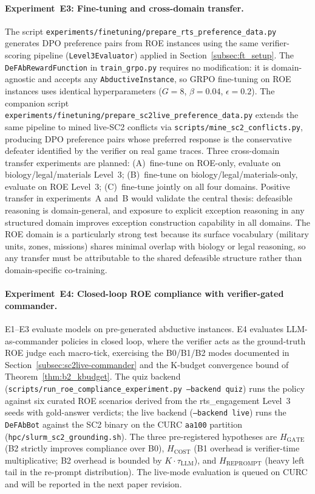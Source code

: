 \documentclass{article}
\theoremstyle{definition}
\begin{document}
\paragraph{Experiment~E3: Fine-tuning and cross-domain transfer.} The script \texttt{experiments/finetuning/prepare\_rts\_preference\_data.py} generates DPO preference pairs from ROE instances using the same verifier-scoring pipeline (\texttt{Level3Evaluator}) applied in Section~\ref{subsec:ft_setup}. The \texttt{DeFAbRewardFunction} in \texttt{train\_grpo.py} requires no modification: it is domain-agnostic and accepts any \texttt{AbductiveInstance}, so GRPO fine-tuning on ROE instances uses identical hyperparameters ($G=8$, $\beta=0.04$, $\epsilon=0.2$). The companion script \texttt{experiments/finetuning/prepare\_sc2live\_preference\_data.py} extends the same pipeline to mined live-SC2 conflicts via \texttt{scripts/mine\_sc2\_conflicts.py}, producing DPO preference pairs whose preferred response is the conservative defeater identified by the verifier on real game traces. Three cross-domain transfer experiments are planned: (A)~fine-tune on ROE-only, evaluate on biology/legal/materials Level~3; (B)~fine-tune on biology/legal/materials-only, evaluate on ROE Level~3; (C)~fine-tune jointly on all four domains. Positive transfer in experiments~A and~B would validate the central thesis: defeasible reasoning is domain-general, and exposure to explicit exception reasoning in any structured domain improves exception construction capability in all domains. The ROE domain is a particularly strong test because its surface vocabulary (military units, zones, missions) shares minimal overlap with biology or legal reasoning, so any transfer must be attributable to the shared defeasible structure rather than domain-specific co-training.

\paragraph{Experiment~E4: Closed-loop ROE compliance with verifier-gated commander.} E1--E3 evaluate models on pre-generated abductive instances. E4 evaluates LLM-as-commander policies in closed loop, where the verifier acts as the ground-truth ROE judge each macro-tick, exercising the B0/B1/B2 modes documented in Section~\ref{subsec:sc2live-commander} and the K-budget convergence bound of Theorem~\ref{thm:b2_kbudget}. The quiz backend (\texttt{scripts/run\_roe\_compliance\_experiment.py --backend quiz}) runs the policy against six curated ROE scenarios derived from the rts\_engagement Level~3 seeds with gold-answer verdicts; the live backend (\texttt{--backend live}) runs the \texttt{DeFAbBot} against the SC2 binary on the CURC \texttt{aa100} partition (\texttt{hpc/slurm\_sc2\_grounding.sh}). The three pre-registered hypotheses are $H_{\mathrm{GATE}}$ (B2 strictly improves compliance over B0), $H_{\mathrm{COST}}$ (B1 overhead is verifier-time multiplicative; B2 overhead is bounded by $K \cdot \tau_{\mathrm{LLM}}$), and $H_{\mathrm{REPROMPT}}$ (heavy left tail in the re-prompt distribution). The live-mode evaluation is queued on CURC and will be reported in the next paper revision.
\end{document}
